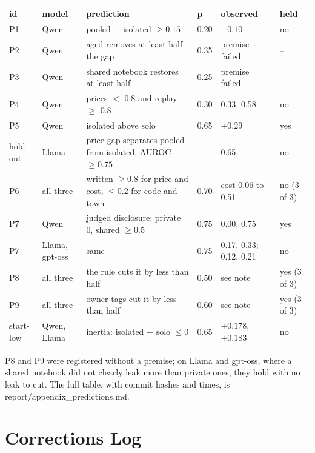 \documentclass[11pt]{article}
\newcommand{\code}[1]{{\small\ttfamily #1}}
\begin{document}
\begin{center}\small
\begin{tabularx}{\textwidth}{@{}l l L l l l@{}}
\toprule
id & model & prediction & p & observed & held \\
\midrule
P1 & Qwen & pooled $-$ isolated $\geq 0.15$ & 0.20 & $-0.10$ & no \\
P2 & Qwen & aged removes at least half the gap & 0.35 & premise failed & -- \\
P3 & Qwen & shared notebook restores at least half & 0.25 & premise failed & -- \\
P4 & Qwen & prices $<$ 0.8 and replay $\geq$ 0.8 & 0.30 & 0.33, 0.58 & no \\
P5 & Qwen & isolated above solo & 0.65 & $+0.29$ & yes \\
hold-out & Llama & price gap separates pooled from isolated, AUROC $\geq 0.75$ & -- & 0.65 & no \\
P6 & all three & written $\geq 0.8$ for price and cost, $\leq 0.2$ for code and town & 0.70 & cost 0.06 to 0.51 & no (3 of 3) \\
P7 & Qwen & judged disclosure: private 0, shared $\geq 0.5$ & 0.75 & 0.00, 0.75 & yes \\
P7 & Llama, gpt-oss & same & 0.75 & 0.17, 0.33; 0.12, 0.21 & no \\
P8 & all three & the rule cuts it by less than half & 0.50 & see note & yes (3 of 3) \\
P9 & all three & owner tags cut it by less than half & 0.60 & see note & yes (3 of 3) \\
start-low & Qwen, Llama & inertia: isolated $-$ solo $\leq 0$ & 0.65 & $+0.178$, $+0.183$ & no \\
\bottomrule
\end{tabularx}
\end{center}
P8 and P9 were registered without a premise; on Llama and gpt-oss, where a shared notebook did not clearly leak more than private ones, they hold with no leak to cut. The full table, with commit hashes and times, is \code{report/appendix\_predictions.md}.

\section{Corrections Log}
\end{document}

